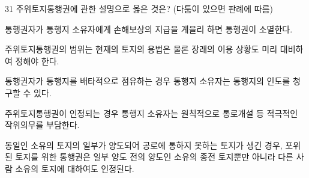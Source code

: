\begin{question}{31}
주위토지통행권에 관한 설명으로 옳은 것은? (다툼이 있으면 판례에 따름)
\begin{choices}
  \item 통행권자가 통행지 소유자에게 손해보상의 지급을 게을리 하면 통행권이 소멸한다.
  \item 주위토지통행권의 범위는 현재의 토지의 용법은 물론 장래의 이용 상황도 미리 대비하여 정해야 한다.
  \item 통행권자가 통행지를 배타적으로 점유하는 경우 통행지 소유자는 통행지의 인도를 청구할 수 있다.
  \item 주위토지통행권이 인정되는 경우 통행지 소유자는 원칙적으로 통로개설 등 적극적인 작위의무를 부담한다.
  \item 동일인 소유의 토지의 일부가 양도되어 공로에 통하지 못하는 토지가 생긴 경우, 포위된 토지를 위한 통행권은 일부 양도 전의 양도인 소유의 종전 토지뿐만 아니라 다른 사람 소유의 토지에 대하여도 인정된다.
\end{choices}
\end{question}
